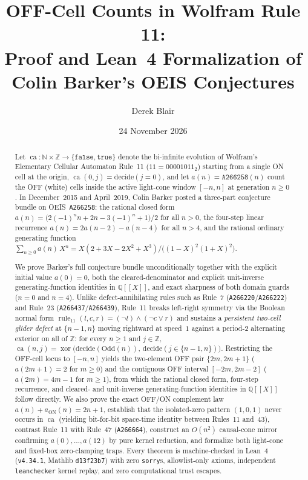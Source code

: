 \documentclass[11pt]{article}
\title{OFF-Cell Counts in Wolfram Rule 11:\\[2pt]
\large Proof and Lean~4 Formalization of Colin Barker's OEIS \seq{A266258} Conjectures}
\author{Derek Blair}
\date{24 November 2026}
\newcommand{\llbracket}{[\![}
\newcommand{\rrbracket}{]\!]}
\theoremstyle{definition}
\newcommand{\N}{\mathbb{N}}
\newcommand{\Z}{\mathbb{Z}}
\newcommand{\Q}{\mathbb{Q}}
\newcommand{\seq}[1]{\texttt{#1}}
\newcommand{\ruleTT}{\operatorname{rule}_{11}}
\newcommand{\ca}{\operatorname{ca}}
\begin{document}
\maketitle

\begin{abstract}
Let $\ca : \N \times \Z \to \{\mathtt{false}, \mathtt{true}\}$ denote the bi-infinite evolution of Wolfram's Elementary Cellular Automaton Rule~11 ($11 = 00001011_2$) starting from a single ON cell at the origin, $\ca(0, j) = \mathrm{decide}(j = 0)$, and let $a(n) = \seq{A266258}(n)$ count the OFF (white) cells inside the active light-cone window $[-n, n]$ at generation $n \ge 0$. In December~2015 and April~2019, Colin Barker posted a three-part conjecture bundle on OEIS~\seq{A266258}: the rational closed form $a(n) = \bigl(2(-1)^n n + 2n - 3(-1)^n + 1\bigr)/2$ for all $n > 0$, the four-step linear recurrence $a(n) = 2a(n-2) - a(n-4)$ for all $n > 4$, and the rational ordinary generating function $\sum_{n \ge 0} a(n)\,X^n = X(2 + 3X - 2X^2 + X^3)/\bigl((1 - X)^2(1 + X)^2\bigr)$.

We prove Barker's full conjecture bundle unconditionally together with the explicit initial value $a(0) = 0$, both the cleared-denominator and explicit unit-inverse generating-function identities in $\Q\llbracket X \rrbracket$, and exact sharpness of both domain guards ($n = 0$ and $n = 4$). Unlike defect-annihilating rules such as Rule~7 (\seq{A266220}/\seq{A266222}) and Rule~23 (\seq{A266437}/\seq{A266439}), Rule~11 breaks left-right symmetry via the Boolean normal form $\ruleTT(l, c, r) = (\neg l) \land (\neg c \lor r)$ and sustains a \emph{persistent two-cell glider defect} at $\{n - 1, n\}$ moving rightward at speed~$1$ against a period-$2$ alternating exterior on all of $\Z$: for every $n \ge 1$ and $j \in \Z$, $\ca(n, j) = \operatorname{xor}\bigl(\mathrm{decide}(\mathrm{Odd}(n)),\, \mathrm{decide}(j \in \{n - 1, n\})\bigr)$. Restricting the OFF-cell locus to $[-n, n]$ yields the two-element OFF pair $\{2m, 2m + 1\}$ ($a(2m + 1) = 2$ for $m \ge 0$) and the contiguous OFF interval $[-2m, 2m - 2]$ ($a(2m) = 4m - 1$ for $m \ge 1$), from which the rational closed form, four-step recurrence, and cleared- and unit-inverse generating-function identities in $\Q\llbracket X \rrbracket$ follow directly. We also prove the exact OFF/ON complement law $a(n) + a_{\mathrm{ON}}(n) = 2n + 1$, establish that the isolated-zero pattern $(1, 0, 1)$ never occurs in $\ca$ (yielding bit-for-bit space-time identity between Rules~11 and~43), contrast Rule~11 with Rule~47 (\seq{A266664}), construct an $O(n^2)$ causal-cone mirror confirming $a(0), \dots, a(12)$ by pure kernel reduction, and formalize both light-cone and fixed-box zero-clamping traps. Every theorem is machine-checked in Lean~4 (\texttt{v4.34.1}, Mathlib \texttt{d13f23b7}) with zero \texttt{sorry}s, allowlist-only axioms, independent \texttt{leanchecker} kernel replay, and zero computational trust escapes.
\end{abstract}
\end{document}
